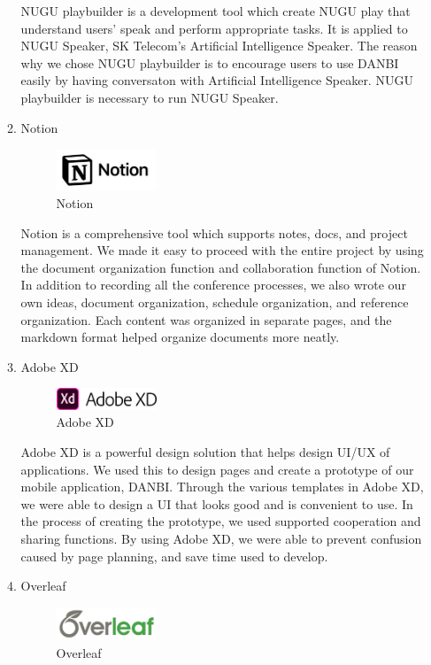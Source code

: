 \documentclass[conference]{IEEEtran}
\begin{document}
\begin{itemize}
\begin{enumerate}
NUGU playbuilder is a development tool which create NUGU play that understand users' speak and perform appropriate tasks. It is applied to NUGU Speaker, SK Telecom's Artificial Intelligence Speaker. The reason why we chose NUGU playbuilder is to encourage users to use DANBI easily by having conversaton with Artificial Intelligence Speaker. NUGU playbuilder is necessary to run NUGU Speaker.

\item Notion
\par \begin{figure}[h!]
\includegraphics[width=3cm]{image/Notion.JPG}
\centering
\caption{Notion}
\end{figure}

Notion is a comprehensive tool which supports notes, docs, and project management. We made it easy to proceed with the entire project by using the document organization function and collaboration function of Notion. In addition to recording all the conference processes, we also wrote our own ideas, document organization, schedule organization, and reference organization. Each content was organized in separate pages, and the markdown format helped organize documents more neatly.

\item Adobe XD
\par \begin{figure}[h!]
\includegraphics[width=3cm]{image/Adobe XD.png}
\centering
\caption{Adobe XD}
\end{figure}

Adobe XD is a powerful design solution that helps design UI/UX of applications. We used this to design pages and create a prototype of our mobile application, DANBI. Through the various templates in Adobe XD, we were able to design a UI that looks good and is convenient to use. In the process of creating the prototype, we used supported cooperation and sharing functions. By using Adobe XD, we were able to prevent confusion caused by page planning, and save time used to develop.

\item Overleaf
\par \begin{figure}[h!]
\includegraphics[width=3cm]{image/Overleaf.png}
\centering
\caption{Overleaf}
\end{figure}


\end{enumerate}
\end{itemize}
\end{document}
